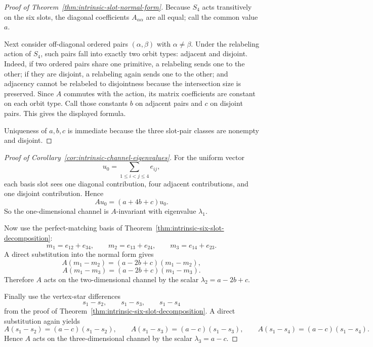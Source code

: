 \begin{proof}[Proof of Theorem~\ref{thm:intrinsic-slot-normal-form}]
\label{proof:thm:intrinsic-slot-normal-form}
Because $S_4$ acts transitively on the six slots, the diagonal coefficients
$A_{\alpha\alpha}$ are all equal; call the common value $a$.

Next consider off-diagonal ordered pairs $(\alpha,\beta)$ with
$\alpha\neq\beta$. Under the relabeling action of $S_4$, such pairs fall into
exactly two orbit types: adjacent and disjoint. Indeed, if two ordered pairs
share one primitive, a relabeling sends one to the other; if they are disjoint,
a relabeling again sends one to the other; and adjacency cannot be relabeled to
disjointness because the intersection size is preserved. Since $A$ commutes
with the action, its matrix coefficients are constant on each orbit type. Call
those constants $b$ on adjacent pairs and $c$ on disjoint pairs. This gives the
displayed formula.

Uniqueness of $a,b,c$ is immediate because the three slot-pair classes are
nonempty and disjoint.
\end{proof}

\begin{proof}[Proof of Corollary~\ref{cor:intrinsic-channel-eigenvalues}]
\label{proof:cor:intrinsic-channel-eigenvalues}
For the uniform vector
\[
u_0=\sum_{1\le i<j\le 4} e_{ij},
\]
each basis slot sees one diagonal contribution, four adjacent contributions,
and one disjoint contribution. Hence
\[
Au_0=(a+4b+c)u_0.
\]
So the one-dimensional channel is $A$-invariant with eigenvalue $\lambda_1$.

Now use the perfect-matching basis of Theorem~\ref{thm:intrinsic-six-slot-decomposition}:
\[
m_1=e_{12}+e_{34},\qquad
m_2=e_{13}+e_{24},\qquad
m_3=e_{14}+e_{23}.
\]
A direct substitution into the normal form gives
\[
A(m_1-m_2)=(a-2b+c)(m_1-m_2),
\]
\[
A(m_1-m_3)=(a-2b+c)(m_1-m_3).
\]
Therefore $A$ acts on the two-dimensional channel by the scalar
$\lambda_2=a-2b+c$.

Finally use the vertex-star differences
\[
s_1-s_2,\qquad s_1-s_3,\qquad s_1-s_4
\]
from the proof of Theorem~\ref{thm:intrinsic-six-slot-decomposition}. A direct
substitution again yields
\[
A(s_1-s_2)=(a-c)(s_1-s_2),\qquad
A(s_1-s_3)=(a-c)(s_1-s_3),\qquad
A(s_1-s_4)=(a-c)(s_1-s_4).
\]
Hence $A$ acts on the three-dimensional channel by the scalar
$\lambda_3=a-c$.
\end{proof}
